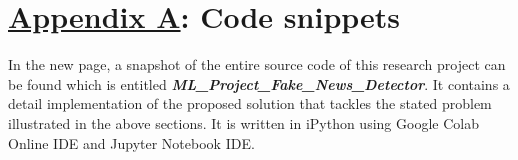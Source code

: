 \documentclass[11.5pt]{article}
\begin{document}
\section*{\underline{Appendix A}: Code snippets}
In the new page, a snapshot of the entire source code of this research project can be found which is entitled \textit{\textbf{ML\_Project\_Fake\_News\_Detector}}. It contains a detail implementation of the proposed solution that tackles the stated problem illustrated in the above sections. It is written in iPython using Google Colab Online IDE and Jupyter Notebook IDE.

\end{document}

